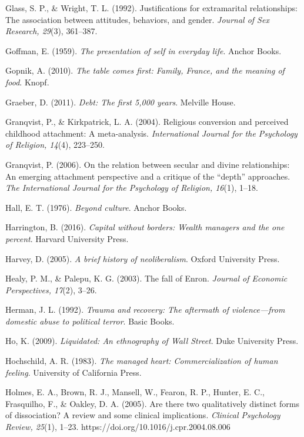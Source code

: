 \begin{thebibliography}{}
    Glass, S. P., \& Wright, T. L. (1992). Justifications for extramarital relationships: The association between attitudes, behaviors, and gender. \textit{Journal of Sex Research, 29}(3), 361–387.
    
    Goffman, E. (1959). \textit{The presentation of self in everyday life}. Anchor Books.

    Gopnik, A. (2010). \textit{The table comes first: Family, France, and the meaning of food}. Knopf.

    Graeber, D. (2011). \textit{Debt: The first 5{,}000 years}. Melville House.

    Granqvist, P., \& Kirkpatrick, L. A. (2004). Religious conversion and perceived childhood attachment: A meta-analysis. \textit{International Journal for the Psychology of Religion, 14}(4), 223–250.

    Granqvist, P. (2006). On the relation between secular and divine relationships: An emerging attachment perspective and a critique of the “depth” approaches. \textit{The International Journal for the Psychology of Religion, 16}(1), 1–18.

    Hall, E. T. (1976). \textit{Beyond culture}. Anchor Books.

    Harrington, B. (2016). \textit{Capital without borders: Wealth managers and the one percent}. Harvard University Press.

    Harvey, D. (2005). \textit{A brief history of neoliberalism}. Oxford University Press.

    Healy, P. M., \& Palepu, K. G. (2003). The fall of Enron. \textit{Journal of Economic Perspectives, 17}(2), 3–26.

    Herman, J. L. (1992). \textit{Trauma and recovery: The aftermath of violence—from domestic abuse to political terror}. Basic Books.

    Ho, K. (2009). \textit{Liquidated: An ethnography of Wall Street}. Duke University Press.
    
    Hochschild, A. R. (1983). \textit{The managed heart: Commercialization of human feeling}. University of California Press.

    Holmes, E. A., Brown, R. J., Mansell, W., Fearon, R. P., Hunter, E. C., Frasquilho, F., \& Oakley, D. A. (2005). Are there two qualitatively distinct forms of dissociation? A review and some clinical implications. \textit{Clinical Psychology Review, 25}(1), 1–23. https://doi.org/10.1016/j.cpr.2004.08.006


\end{thebibliography}
